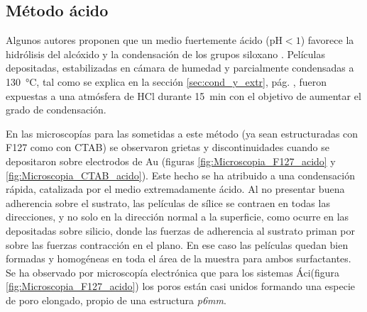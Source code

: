 
	 \subsection{Método ácido}

	 	 Algunos autores proponen que un medio fuertemente ácido (pH$<1$) favorece la hidrólisis del alcóxido y la condensación de los grupos siloxano \cite{Soler-Illia2011,Doshi2000a,Huo1996,Boissiere2000,Beck1992}. Películas depositadas, estabilizadas en cámara de humedad y parcialmente condensadas a \SI{130}{\celsius}, tal como se explica en la sección \ref{sec:cond_y_extr}, pág. \pageref{sec:cond_y_extr}, fueron expuestas a una atmósfera de HCl durante \SI{15}{\minute} con el objetivo de aumentar el grado de condensación. 

		 En las microscopías para las \pdm\space sometidas a este método (ya sean estructuradas con F127 como con CTAB) se observaron grietas y discontinuidades cuando se depositaron sobre electrodos de Au (figuras \ref{fig:Microscopia_F127_acido} y \ref{fig:Microscopia_CTAB_acido}). Este hecho se ha atribuido a una condensación rápida, catalizada por el medio extremadamente ácido. Al no presentar buena adherencia sobre el sustrato, las películas de sílice se contraen en todas las direcciones, y no solo en la dirección normal a la superficie, como ocurre en las \pdm\space depositadas sobre silicio, donde las fuerzas de adherencia al sustrato priman por sobre las fuerzas contracción en el plano\cite{Sakatani2006,Boissiere2005,Guillemin2010}. En ese caso las películas quedan bien formadas y homogéneas en toda el área de la muestra para ambos surfactantes. Se ha observado por microscopía electrónica que para los sistemas Áci\pdmF\space (figura \ref{fig:Microscopia_F127_acido}) los  poros están casi unidos formando una especie de poro elongado, propio de una estructura \textit{p6mm}\cite{GonzalezSolveyra2017}. 
	
